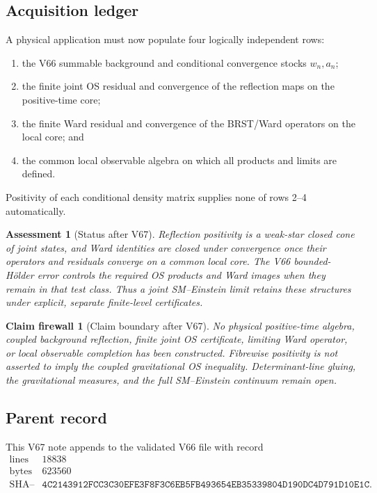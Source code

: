 \documentclass[11pt]{article}
\newtheorem{firewall}[theorem]{Claim firewall}
\newtheorem{assessment}[theorem]{Assessment}
\theoremstyle{remark}
\begin{document}
\subsection{Acquisition ledger}

A physical application must now populate four logically independent
rows:
\begin{enumerate}
\item the V66 summable background and conditional convergence
stocks \(w_n,a_n\);
\item the finite joint OS residual and convergence of the reflection
maps on the positive-time core;
\item the finite Ward residual and convergence of the BRST/Ward
operators on the local core; and
\item the common local observable algebra on which all products and
limits are defined.
\end{enumerate}
Positivity of each conditional density matrix supplies none of rows
2--4 automatically.

\begin{assessment}[Status after V67]
\label{ass:v12v67-status}
Reflection positivity is a weak-star closed cone of joint states,
and Ward identities are closed under convergence once their
operators and residuals converge on a common local core.  The V66
bounded-Hölder error controls the required OS products and Ward
images when they remain in that test class.  Thus a joint
SM--Einstein limit retains these structures under explicit,
separate finite-level certificates.
\end{assessment}

\begin{firewall}[Claim boundary after V67]
\label{fire:v12v67-claim}
No physical positive-time algebra, coupled background reflection,
finite joint OS certificate, limiting Ward operator, or local
observable completion has been constructed.  Fibrewise positivity
is not asserted to imply the coupled gravitational OS inequality.
Determinant-line gluing, the gravitational measures, and the full
SM--Einstein continuum remain open.
\end{firewall}

\subsection{Parent record}

This V67 note appends to the validated V66 file with record
\[
\begin{array}{c|c}
\text{lines}&18838\\
\text{bytes}&623560\\
\text{SHA--256}&
\texttt{4C2143912FCC3C30EFE3F8F3C6EB5FB493654EB35339804D190DC4D791D10E1C}.
\end{array}
\]
\end{document}
